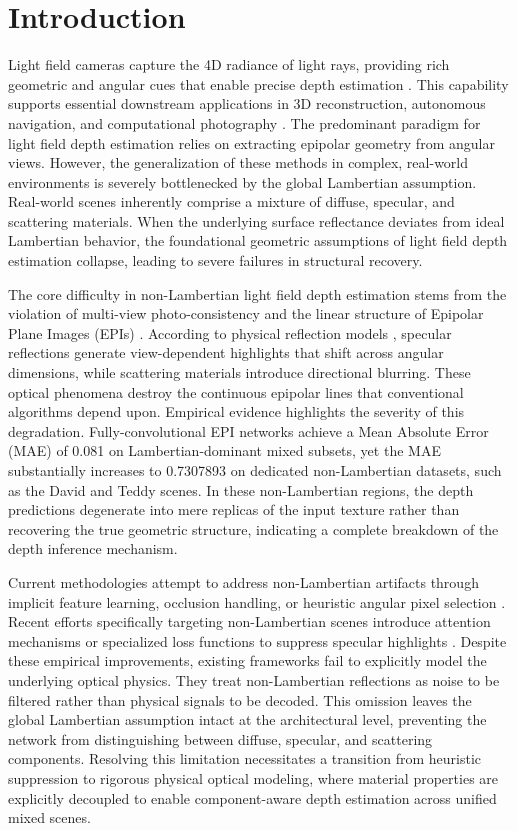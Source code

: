 \documentclass[lettersize,journal]{IEEEtran}
\begin{document}
\section{Introduction}

Light field cameras capture the 4D radiance of light rays, providing rich geometric and angular cues that enable precise depth estimation \cite{ng2005, ng2006}. This capability supports essential downstream applications in 3D reconstruction, autonomous navigation, and computational photography \cite{honauer2016}. The predominant paradigm for light field depth estimation relies on extracting epipolar geometry from angular views. However, the generalization of these methods in complex, real-world environments is severely bottlenecked by the global Lambertian assumption. Real-world scenes inherently comprise a mixture of diffuse, specular, and scattering materials. When the underlying surface reflectance deviates from ideal Lambertian behavior, the foundational geometric assumptions of light field depth estimation collapse, leading to severe failures in structural recovery.

The core difficulty in non-Lambertian light field depth estimation stems from the violation of multi-view photo-consistency and the linear structure of Epipolar Plane Images (EPIs) \cite{wanner2014, wang2015}. According to physical reflection models \cite{blinn1977}, specular reflections generate view-dependent highlights that shift across angular dimensions, while scattering materials introduce directional blurring. These optical phenomena destroy the continuous epipolar lines that conventional algorithms depend upon. Empirical evidence highlights the severity of this degradation. Fully-convolutional EPI networks \cite{heber2018} achieve a Mean Absolute Error (MAE) of 0.081 on Lambertian-dominant mixed subsets, yet the MAE substantially increases to 0.7307893 on dedicated non-Lambertian datasets, such as the David and Teddy scenes. In these non-Lambertian regions, the depth predictions degenerate into mere replicas of the input texture rather than recovering the true geometric structure, indicating a complete breakdown of the depth inference mechanism.

Current methodologies attempt to address non-Lambertian artifacts through implicit feature learning, occlusion handling, or heuristic angular pixel selection \cite{tao2013, chen2017}. Recent efforts specifically targeting non-Lambertian scenes introduce attention mechanisms or specialized loss functions to suppress specular highlights \cite{li2021, zhang2023}. Despite these empirical improvements, existing frameworks fail to explicitly model the underlying optical physics. They treat non-Lambertian reflections as noise to be filtered rather than physical signals to be decoded. This omission leaves the global Lambertian assumption intact at the architectural level, preventing the network from distinguishing between diffuse, specular, and scattering components. Resolving this limitation necessitates a transition from heuristic suppression to rigorous physical optical modeling, where material properties are explicitly decoupled to enable component-aware depth estimation across unified mixed scenes.
\end{document}
